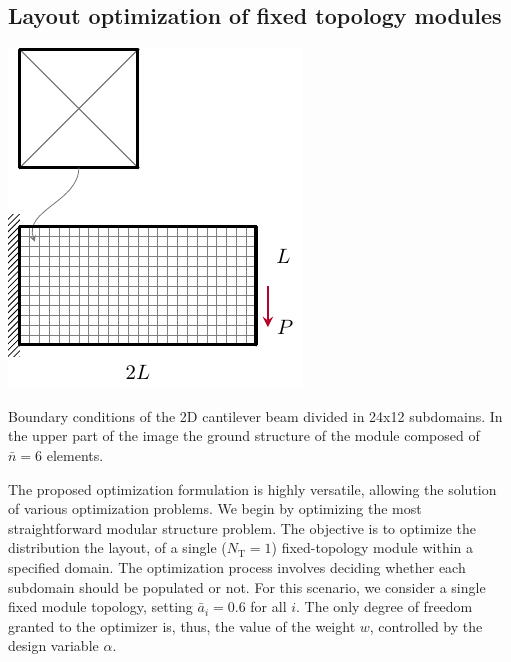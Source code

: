 \subsection{Layout optimization of fixed topology modules}
\begin{marginfigure}
    \centering
    \includegraphics[width=\linewidth]{figures/06_DMO/00_cantilever_bcs/cant_mesh.pdf}
    \caption{Boundary conditions of the 2D cantilever beam divided in 24x12 subdomains. In the upper part of the image the ground structure of the module composed of $\bar{n}=6$ elements.}
    \label{fig:06_cant_BC_GS}
\end{marginfigure}
The proposed optimization formulation is highly versatile, allowing the solution of various optimization problems. We begin by optimizing the most straightforward modular structure problem. The objective is to optimize the distribution \ie the layout, of a single ($N_\text{T}=1$) fixed-topology module within a specified domain. The optimization process involves deciding whether each subdomain should be populated or not. For this scenario, we consider a single fixed module topology, setting $\bar{a}_i=0.6$ for all $i$. The only degree of freedom granted to the optimizer is, thus, the value of the weight $w$, controlled by the design variable $\alpha$.

